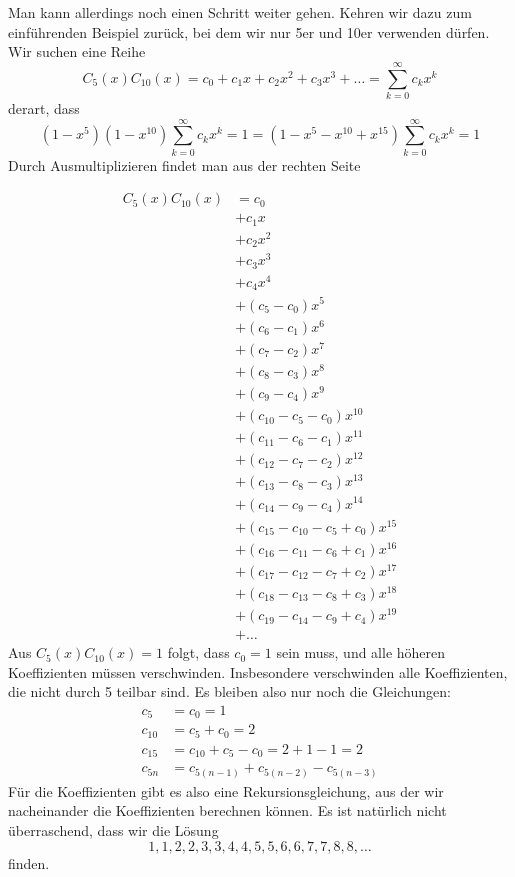 Man kann allerdings noch einen Schritt weiter gehen.
Kehren wir dazu zum
einführenden Beispiel zurück, bei dem wir nur 5er und 10er verwenden
dürfen.
Wir suchen eine Reihe
\[
C_5(x)C_{10}(x)=c_0+c_1x+c_2x^2+c_3x^3+\dots=\sum_{k=0}^\infty c_kx^k
\]
derart, dass
\[
(1-x^5)(1-x^{10}) \sum_{k=0}^\infty c_kx^k=1
=
(1-x^5-x^{10}+x^{15}) \sum_{k=0}^\infty c_kx^k=1
\]
Durch Ausmultiplizieren findet man aus der rechten Seite

{\allowdisplaybreaks
\begin{align*}
C_5(x)C_{10}(x)&=c_0\\
&+c_1x\\
&+c_2x^2\\
&+c_3x^3\\
&+c_4x^4\\
&+(c_5-c_0)x^5\\
&+(c_6-c_1)x^6\\
&+(c_7-c_2)x^7\\
&+(c_8-c_3)x^8\\
&+(c_9-c_4)x^9\\
&+(c_{10} - c_5 -c_0)x^{10}\\
&+(c_{11} - c_6 -c_1)x^{11}\\
&+(c_{12} - c_7 -c_2)x^{12}\\
&+(c_{13} - c_8 -c_3)x^{13}\\
&+(c_{14} - c_9 -c_4)x^{14}\\
&+(c_{15} - c_{10} - c_{5} +c_0)x^{15}\\
&+(c_{16} - c_{11} - c_{6} +c_1)x^{16}\\
&+(c_{17} - c_{12} - c_{7} +c_2)x^{17}\\
&+(c_{18} - c_{13} - c_{8} +c_3)x^{18}\\
&+(c_{19} - c_{14} - c_{9} +c_4)x^{19}\\
&+\dots
\end{align*}
}
Aus $C_{5}(x)C_{10}(x)=1$ folgt, dass $c_0=1$ sein muss, und alle
höheren Koeffizienten müssen verschwinden.
Insbesondere verschwinden
alle Koeffizienten, die nicht durch 5 teilbar sind.
Es bleiben also nur noch
die Gleichungen:
\begin{align*}
c_5&=c_0=1\\
c_{10}&=c_5+c_0=2\\
c_{15}&=c_{10}+c_{5}-c_0=2 + 1 - 1=2\\
c_{5n}&=c_{5(n-1)}+c_{5(n-2)}-c_{5(n-3)}
\end{align*}
Für die Koeffizienten gibt es also eine Rekursionsgleichung, aus der wir
nacheinander die Koeffizienten berechnen können.
Es ist natürlich nicht
überraschend, dass wir die Lösung
\[
1, 1, 2, 2, 3, 3, 4, 4, 5, 5, 6, 6, 7, 7, 8, 8, \dots
\]
finden.

